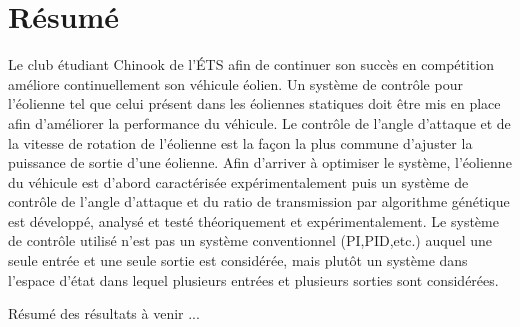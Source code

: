 \section*{Résumé}

Le club étudiant Chinook de l'ÉTS afin de continuer son succès en compétition améliore continuellement son véhicule éolien. Un système de contrôle pour l'éolienne tel que celui présent dans les éoliennes statiques doit être mis en place afin d'améliorer la performance du véhicule. Le contrôle de l'angle d'attaque et de la vitesse de rotation de l'éolienne est la façon la plus commune d'ajuster la puissance de sortie d'une éolienne. Afin d'arriver à optimiser le système, l’éolienne du véhicule est d’abord caractérisée expérimentalement puis un système de contrôle de l'angle d'attaque et du ratio de transmission par algorithme génétique est développé, analysé et testé théoriquement et expérimentalement. Le système de contrôle utilisé n'est pas un système conventionnel (PI,PID,etc.) auquel une seule entrée et une seule sortie est considérée, mais plutôt un système dans l'espace d'état dans lequel plusieurs entrées et plusieurs sorties sont considérées.

Résumé des résultats à venir ...
